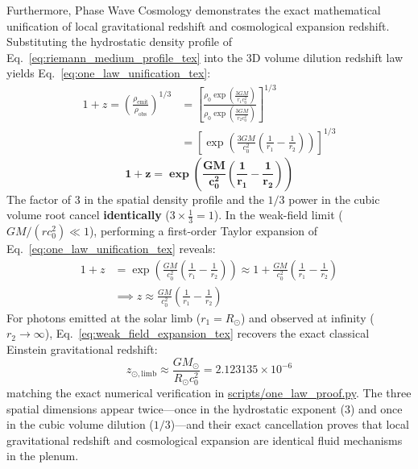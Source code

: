 \documentclass[11pt,a4paper]{article}
\begin{document}
Furthermore, Phase Wave Cosmology demonstrates the exact mathematical unification of local gravitational redshift and cosmological expansion redshift. Substituting the hydrostatic density profile of Eq.~\eqref{eq:riemann_medium_profile_tex} into the 3D volume dilution redshift law yields Eq.~\eqref{eq:one_law_unification_tex}:
\begin{equation}
\begin{aligned} 1 + z = \left( \frac{\rho_{\text{emit}}}{\rho_{\text{obs}}} \right)^{1/3} &= \left[ \frac{\rho_0 \exp\left( \frac{3GM}{r_1 c_0^2} \right)}{\rho_0 \exp\left( \frac{3GM}{r_2 c_0^2} \right)} \right]^{1/3} \\ &= \left[ \exp\left( \frac{3GM}{c_0^2} \left( \frac{1}{r_1} - \frac{1}{r_2} \right) \right) \right]^{1/3} \end{aligned}
\end{equation}
\begin{equation}
\mathbf{1 + z = \exp\left( \frac{GM}{c_0^2} \left( \frac{1}{r_1} - \frac{1}{r_2} \right) \right)}
\label{eq:one_law_unification_tex}
\end{equation}
The factor of $3$ in the spatial density profile and the $1/3$ power in the cubic volume root cancel \textbf{identically} ($3 \times \frac{1}{3} = 1$). In the weak-field limit ($GM / (r c_0^2) \ll 1$), performing a first-order Taylor expansion of Eq.~\eqref{eq:one_law_unification_tex} reveals:
\begin{equation}
\begin{aligned} 1 + z &= \exp\left( \frac{GM}{c_0^2} \left( \frac{1}{r_1} - \frac{1}{r_2} \right) \right) \approx 1 + \frac{GM}{c_0^2} \left( \frac{1}{r_1} - \frac{1}{r_2} \right) \\ &\implies z \approx \frac{GM}{c_0^2} \left( \frac{1}{r_1} - \frac{1}{r_2} \right) \end{aligned}
\label{eq:weak_field_expansion_tex}
\end{equation}
For photons emitted at the solar limb ($r_1 = R_\odot$) and observed at infinity ($r_2 \to \infty$), Eq.~\eqref{eq:weak_field_expansion_tex} recovers the exact classical Einstein gravitational redshift:
\begin{equation}
z_{\odot,\text{limb}} \approx \frac{G M_\odot}{R_\odot c_0^2} = 2.123135 \times 10^{-6}
\label{eq:solar_limb_redshift}
\end{equation}
matching the exact numerical verification in \url{scripts/one_law_proof.py}. The three spatial dimensions appear twice---once in the hydrostatic exponent ($3$) and once in the cubic volume dilution ($1/3$)---and their exact cancellation proves that local gravitational redshift and cosmological expansion are identical fluid mechanisms in the plenum.
\end{document}
